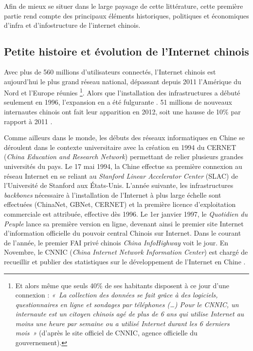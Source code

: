Afin de mieux se situer dans le large paysage de cette littérature, cette première partie rend compte des principaux éléments historiques, politiques et économiques d’infra et d’infostructure de l’internet chinois.

\subsection[Petite histoire et évolution de l’Internet chinois]{Petite histoire et évolution de l’Internet chinois}

Avec plus de 560 millions d’utilisateurs connectés, l’Internet chinois est aujourd’hui le plus grand réseau national, dépassant depuis 2011 l’Amérique du Nord et l’Europe réunies \citep{CNNIC2013}\footnote{Et alors même que seuls 40\% de ses habitants disposent à ce jour d’une connexion : \textit{« La collection des données se fait grâce à des logiciels, questionnaires en ligne et sondages par téléphones (…) Pour le CNNIC, un internaute est un citoyen chinois agé de plus de 6 ans qui utilise Internet au moins une heure par semaine ou a utilisé Internet durant les 6 derniers mois »} (d’après le site officiel de CNNIC, agence officielle du gouvernement).}. Alors que l’installation des infrastructures a débuté seulement en 1996, l’expansion en a été fulgurante \citep{Fang2006}. 51 millions de nouveaux internautes chinois ont fait leur apparition en 2012, soit une hausse de 10\% par rapport à 2011 \citep{CNNIC2013}. 

Comme ailleurs dans le monde, les débuts des réseaux informatiques en Chine se déroulent dans le contexte universitaire avec la création en 1994 du CERNET (\textit{China Education and Research Network}) permettant de relier plusieurs grandes universités du pays. Le 17 mai 1994, la Chine effectue sa première connexion au réseau Internet en se reliant au \textit{Stanford Linear Accelerator Center} (SLAC) de l’Université de Stanford aux États-Unis. L’année suivante, les infrastructures \textit{backbones} nécessaire à l’installation de l’Internet à plus large échelle sont effectuées (ChinaNet, GBNet, CERNET) et la première licence d’exploitation commerciale est attribuée, effective dès 1996. Le 1er janvier 1997, le \textit{Quotidien du Peuple} lance sa première version en ligne, devenant ainsi le premier site Internet d’information officielle du pouvoir central Chinois sur Internet. Dans le courant de l’année, le premier FAI privé chinois \textit{China InfoHighway} voit le jour. En Novembre, le CNNIC (\textit{China Internet Network Information Center}) est chargé de recueillir et publier des statistiques sur le développement de l’Internet en Chine \citep{Dai2007}.

